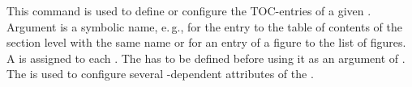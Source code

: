 \begin{Declaration}
\end{Declaration}
%
This command is used to define
or configure the TOC-entries of a given . Argument
 is a symbolic name, e.\,g.,  for the entry
to the table of contents of the section level with the same name or
 for an entry of a figure to the list of figures. A 
is assigned to each . The  has to be defined
before using it as an argument of . The
 is used to configure several -dependent
attributes of the .

